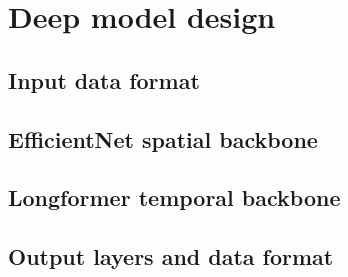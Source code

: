 \section{Deep model design}
\label{sec:Deep model design}
\subsection{Input data format}
\subsection{EfficientNet spatial backbone}
\subsection{Longformer temporal backbone}
\subsection{Output layers and data format}